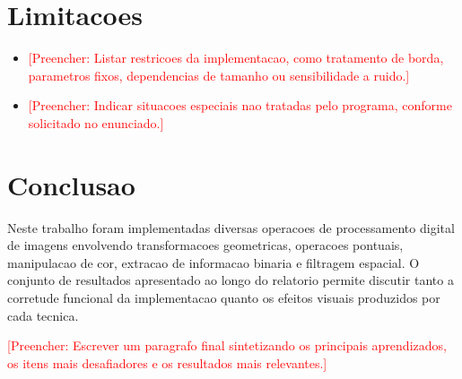 \documentclass[12pt,a4paper]{article}
\newcommand{\placeholder}[1]{\textcolor{red}{[Preencher: #1]}}
\begin{document}
\section{Limitacoes}

\begin{itemize}[leftmargin=*]
  \item \placeholder{Listar restricoes da implementacao, como tratamento de borda, parametros fixos, dependencias de tamanho ou sensibilidade a ruido.}
  \item \placeholder{Indicar situacoes especiais nao tratadas pelo programa, conforme solicitado no enunciado.}
\end{itemize}

\section{Conclusao}

Neste trabalho foram implementadas diversas operacoes de processamento digital de imagens envolvendo transformacoes geometricas, operacoes pontuais, manipulacao de cor, extracao de informacao binaria e filtragem espacial. O conjunto de resultados apresentado ao longo do relatorio permite discutir tanto a corretude funcional da implementacao quanto os efeitos visuais produzidos por cada tecnica.

\placeholder{Escrever um paragrafo final sintetizando os principais aprendizados, os itens mais desafiadores e os resultados mais relevantes.}
\end{document}
